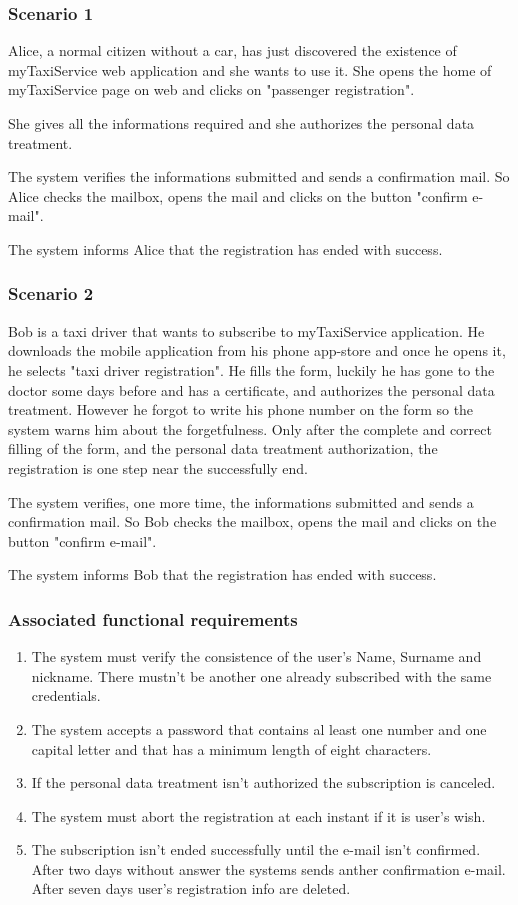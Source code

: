 \subsubsection{Scenario 1}
Alice, a normal citizen without a car, has just discovered the existence of myTaxiService web application and she wants to use it. 
She opens the home of myTaxiService page on web and clicks on "passenger registration". 

She gives all the informations required and she authorizes the personal data treatment. 

The system verifies the informations submitted and sends a confirmation mail.
So Alice checks the mailbox, opens the mail and clicks on the button "confirm e-mail". 

The system informs Alice that the registration has ended with success.

\subsubsection{Scenario 2}
Bob is a taxi driver that wants to subscribe to myTaxiService application. 
He downloads the mobile application from his phone app-store and once he opens it, he selects "taxi driver registration". 
He fills the form, luckily he has gone to the doctor some days before and has a certificate, and authorizes the personal data treatment.
However he forgot to write his phone number on the form so the system warns him about the forgetfulness.
Only after the complete and correct filling of the form, and the personal data treatment authorization, the registration is one step near the successfully end.

The system verifies, one more time, the informations submitted and sends a confirmation mail.
So Bob checks the mailbox, opens the mail and clicks on the button "confirm e-mail". 

The system informs Bob that the registration has ended with success.




\subsubsection{Associated functional requirements}
\begin{enumerate}
\item The system must verify the consistence of the user's Name, Surname and nickname. There mustn't be another one already subscribed with the same credentials.
\item The system accepts a password that contains al least one number and one capital letter and that has a minimum length of eight characters.
\item If the personal data treatment isn't authorized the subscription is canceled.
\item The system must abort the registration at each instant if it is user's wish.
\item The subscription isn't ended successfully until the e-mail isn't confirmed. After two days without answer the systems sends anther confirmation e-mail. After seven days user's registration info are deleted.
\end{enumerate}

